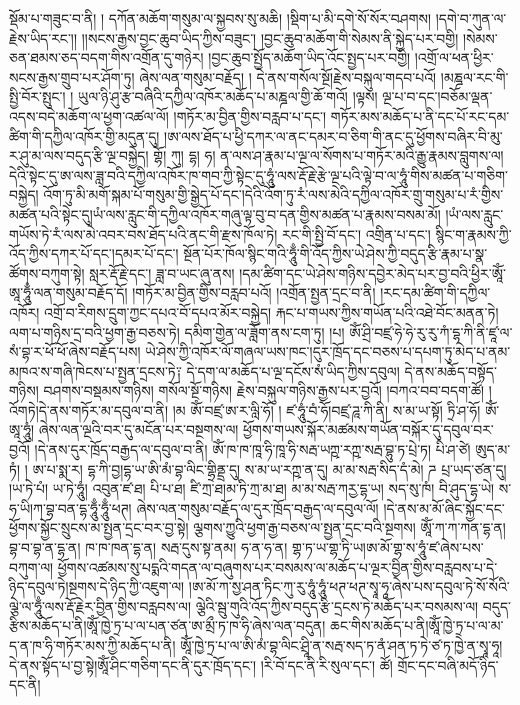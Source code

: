 སྡོམ་པ་གཟུང་བ་ནི། ། དཀོན་མཆོག་གསུམ་ལ་སྐྱབས་སུ་མཆི། །སྡིག་པ་མི་དགེ་སོ་སོར་བཤགས། །དགེ་བ་ཀུན་ལ་རྗེས་ཡིད་རང་།། །།སངས་རྒྱས་བྱང་ཆུབ་ཡིད་ཀྱིས་བཟུང་། །བྱང་ཆུབ་མཆོག་གི་སེམས་ནི་སྐྱེད་པར་བགྱི། །སེམས་ཅན་ཐམས་ཅད་བདག་གིས་འགྲོན་དུ་གཉེར། །བྱང་ཆུབ་སྤྱོད་མཆོག་ཡིད་འོང་སྤྱད་པར་བགྱི། །འགྲོ་ལ་ཕན་ཕྱིར་སངས་རྒྱས་གྲུབ་པར་ཤོག་ཏུ། ཞེས་ལན་གསུམ་བརྗོད། ། དེ་ནས་གསོལ་སྔོ།རྗེས་བསྐུལ་གདབ་པའོ། །མཎྜལ་རང་གི་སྤྱི་བོར་སྤུང་། ། ཡུལ་ཉི་ཤུ་རྩ་བཞིའི་དཀྱིལ་འཁོར་མཆོད་པ་མཎྜལ་གྱི་ཆོ་གའོ། །ལྟས། ལྔ་པ་བ་དང་།བཅོམ་ལྡན་འདས་བདེ་མཆོག་ལ་ཕྱག་འཚལ་ལོ། །གཏོར་མ་བྱིན་གྱིས་བརླབ་པ་དང་། གཏོར་མས་མཆོད་པ་ནི་དང་པོ་རང་དམ་ཚིག་གི་དཀྱིལ་འཁོར་གྱི་མདུན་དུ། །ཨ་ལས་ཐོད་པ་ཕྱི་དཀར་ལ་ནང་དམར་བ་ཅིག་གི་ནང་དུ་ཕྱོགས་བཞིར་བི་མུ་ར་ཤུ་མ་ལས་བདུད་རྩི་ལྔ་བསྐྱེད། གྷོ། ཀུ། དྷ། ཧ། ན་ལས་ཤ་རྣམ་པ་ལྔ་ལ་སོགས་པ་གཏོར་མའི་རྒྱུ་རྣམས་བླུགས་ལ། དེའི་སྟེང་དུ་ཨ་ལས་ཟླ་བའི་དཀྱིལ་འཁོར་ཁ་གབ་ཀྱི་སྟེང་དུ་ཧཱུཾ་ལས་རྡོ་རྗེ་རྩེ་ལྔ་པའི་ལྟེ་བ་ལ་ཧཱུཾ་གིས་མཚན་པ་གཅིག་བསྐྱེད། འོག་ཏུ་མི་མགོ་སྐམ་པོ་གསུམ་གྱི་སྒྱེད་པོ་དང་།དེའི་འོག་ཏུ་རཾ་ལས་མེའི་དཀྱིལ་འཁོར་གྲུ་གསུམ་པ་རཾ་གྱིས་མཚན་པའི་སྟེང་དུ།ཡཾ་ལས་རླུང་གི་དཀྱིལ་འཁོར་གཞུ་ལྟ་བུ་བ་དན་གྱིས་མཚན་པ་རྣམས་བསམ་མོ། །ཡཾ་ལས་རླུང་གཡོས་ཏེ་རཾ་ལས་མེ་འབར་བས་ཐོད་པའི་ནང་གི་རྫས་ཁོལ་ཏེ། རང་གི་སྤྱི་བོ་དང་། འགྲིན་པ་དང་། སྙིང་ག་རྣམས་ཀྱི་འོད་ཀྱིས་དཀར་པོ་དང་།དམར་པོ་དང་། སྔོན་པོར་ཁོལ་སྙིང་གའི་ཧཱུྃ་གི་འོད་ཀྱིས་ཡེ་ཤེས་ཀྱི་བདུད་རྩི་རྣམ་པ་སྣ་ཚོགས་བཀུག་སྟེ། སླར་རྡོ་རྗེ་དང་། ཟླ་བ་ཡང་ཞུ་ནས། །དམ་ཚིག་དང་ཡེ་ཤེས་གཉིས་དབྱེར་མེད་པར་བྱ་བའི་ཕྱིར་ཨཱོཾ་ཨཱ་ཧཱུྃ་ལན་གསུམ་བརྗོད་དོ། །གཏོར་མ་བྱིན་གྱིས་བརླབ་པའོ། །འགྲོན་སྤྱན་དྲང་བ་ནི། །རང་དམ་ཚིག་གི་དཀྱིལ་འཁོར། འགྲོ་བ་རིགས་དྲུག་ཀྱང་དཔའ་བོ་དཔའ་མོར་བསྐྱེད། རྐང་པ་གཡས་ཀྱིས་གཡོན་པའི་འཐེ་བོང་མནན་ཏེ། ལག་པ་གཉིས་དྲ་བའི་ཕྱག་རྒྱ་བཅས་ཏེ། དམིག་གྱེན་ལ་ཟློག་ནས་ངག་ཏུ། །པ། ཨོཾ་ཤྲི་བཛྲ་ཧེ་ཧེ་རུ་རུ་ཀཾ་དྷ་ཀི་ནི་ཛཱ་ལ་སཾ་བྷ་ར་ཕོ་ཕོ་ཞེས་བརྗོད་པས། ཡེ་ཤེས་ཀྱི་འཁོར་ལོ་གཞལ་ཡས་ཁང་།དུར་ཁྲོད་དང་བཅས་པ་དཔག་ཏུ་མེད་པ་ནམ་མཁའ་ས་གཞི་ཁེངས་པ་སྤྱན་དྲངས་ཏེ༑ དེ་དག་ལ་མཆོད་པ་ལྔ་དངོས་སཾ་ཡིད་ཀྱིས་དབུལ། དེ་ནས་མཆོད་བསྟོད་གཉིས། བཤགས་བསྡམས་གཉིས། གསོལ་སྔོ་གཉིས། རྗེས་བསྐུལ་གཉིས་རྒྱས་པར་བྱའོ། །བཀའ་བབ་བདག་ཚོ། ། འོགཏེ།དེ་ནས་གཏོར་མ་དབུལ་བ་ནི། །མ ཨོཾ་བཛྲ་ཨ་ར་ལླི་ཧོ། ། ཛ་ཧཱུཾ་བཾ་ཧོ།བཛྲ་ཌཱ་ཀི་ནི། ས་མ་ཡ་སྟོ། ཏྲི་ཤ་ཧོ། ཨོཾ་ཨཱ་ཧཱུཾ། ཞེས་ལན་ལྔའི་བར་དུ་མངོན་པར་བསྔགས་ལ། ཕྱོགས་གཡས་སྐོར་མཚམས་གཡོན་བསྐོར་དུ་དབུལ་བར་བྱའོ། །དེ་ནས་དུར་ཁྲོད་བརྒྱད་ལ་དབུལ་བ་ནི། ཨོཾ་ཁ་ཁ་ཁཱ་ཧི་ཁཱ་ཧི་སརྦ་ཡཀྵ་རཀྵ་སརྦ་བྷུ་ཏ་པྲེ་ཏ། པི་ཤ་ཙེ། ཨུད་མ་ཏཾ། ། ཨ་པ་སྨ་ར། དྷ་ཀི་བྱ།དྷ་ཡ་ཨི་མཾ་བྷ་ལིང་གྷྲིནྡྲ་དུ། ས་མ་ཡ་རཀྵ་ན་དུ། མ་མ་སརྦ་སིད་དཾ་མེ། ཌ པྲ་ཡད་ཙན་དུ། །ཡ་ཏེ་པཾ། ཡ་ཏེ་ཧཱུཾ། འབུན་ཛ་ཐ། པི་པ་ཐ། ཛི་ཀྲ་ཐ།མ་ཏི་ཀྲ་མ་ཐ། མ་མ་སརྦ་ཀརྱ་དྷ་ཡ། སད་སུ་ཁཾ། བི་ཤུད་དྷ་ཡེ། ས་ཧ་ཡི།ཀ་བྷ་བན་དྷ་ཧཱུྃ་ཧཱུྃ་ཕཊ། ཞེས་ལན་གསུམ་བརྗོད་ལ་དུར་ཁྲོད་བརྒྱད་ལ་དབུལ་ལོ། །དེ་ནས་མ་མོ་ཞིང་སྐྱོང་དང་ཕྱོགས་སྐྱོང་སྲུངས་མ་སྤྱན་དྲང་བར་བྱ་སྟེ། ལྕགས་ཀྱུའི་ཕྱག་རྒྱ་བཅས་ལ་སྤྱན་དྲང་བའི་སྔགས། ཨཱོཾ་ཀ་ཀ་ཀན་དྷ་ན། བྷ་བ་བྷ་ན་དྷ་ན། ཁ་ཁ་ཁན་དྷ་ན། སརྦ་དུས་སྟ་ནམ། ཧ་ན་ཧ་ན། གྷ་ཏ་ཡ་གྷ་ཏི་ཡ།ཨ་མོ་གྷ་ས་ཧཱུཾ་ཛ་ཞེས་པས་བཀུག་ལ། ཕྱོགས་འཚམས་སུ་པདྨའི་གདན་ལ་བཞུགས་པར་བསམས་ལ་མཆོད་པ་ལྔར་བྱིན་གྱིས་བརླབས་པ་དེ་ཉིད་དབུལ་ཏེ།སྔགས་དེ་ཉིད་ཀྱི་འཇུག་ལ། །ཨ་མོ་ཀ་སྱ་ཤན་ཏིང་ཀུ་རུ་ཧཱུཾ་ཧཱུཾ་ཕཊ་ཕཊ་སྭཱ་ཧཱ་ཞེས་པས་དབུལ་ཏེ་སོ་སོའི་ལྕེ་ལ་ཧཱུྃ་ལས་རྡོ་རྗེར་བྱིན་གྱིས་བརླབས་ལ། ལྕེའི་སྦུ་གུའི་འོད་ཀྱིས་བདུད་རྩི་དྲངས་ཏེ་མཆོད་པར་བསམས་ལ། བདུད་རྩིས་མཆོད་པ་ནི།ཨཱོཾ་ཁྱེ་ཏྲ་པ་ལ་པན་ཙན་ཨ་མྲྀ་ཏ་ཁ་ཧི་ཞེས་ལན་བདུན། ཆང་གིས་མཆོད་པ་ནི།ཨཱོཾ་ཁྱེ་ཏྲ་པ་ལ་མ་ད་ན་ཁ་ཧི་གཏོར་མས་ཀྱི་མཆོད་པ་ནི། ཨཱོཾ་ཁྱེ་ཏྲ་པ་ལ་ཨི་མཾ་བྷ་ལིང་ཤྲཱི་ན་སརྦ་སད་ཏ་ནཾ་ཤན་ཏ་ཏེ་ཙ་ཏ་ཁྱེ་ན་སྭཱ་ཧཱ། དེ་ནས་སྟོད་པ་བྱ་སྟེ།ཨཱོཾ་ཤིང་གཅིག་དང་ནི་དུར་ཁྲོད་དང་། །རི་བོ་དང་ནི་རི་སུལ་དང་། ཚོ། གྲོང་དང་བཞི་མདོ་ཉིད་དང་ནི། 